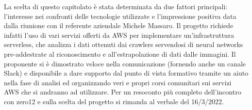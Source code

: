 La scelta di questo capitolato è stata determinata da due fattori principali: l'interesse nei confronti delle tecnologie utilizzate e l'impressione positiva data dalla riunione con il referente aziendale Michele Massaro.
Il progetto richiede infatti l'uso di vari servizi offerti da AWS per implementare un'infrastruttura serverless, che analizza i dati ottenuti dai crawlers servendosi di neural networks pre-addestrate al riconoscimento e all'estrapolazione di dati dalle immagini. \newline
Il proponente si è dimostrato veloce nella comunicazione (fornendo anche un canale Slack) e disponibile a dare supporto dal punto di vista formativo tramite un aiuto nella fase di analisi ed organizzando veri e propri corsi comunitari sui servizi AWS che si andranno ad utilizzare.
Per un resoconto più completo dell'incontro con zero12 e sulla scelta del progetto si rimanda al verbale del 16/3/2022.
